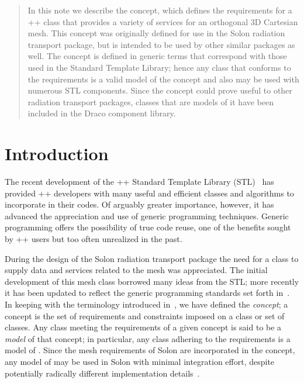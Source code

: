 \documentclass[11pt]{rnote}
\begin{document}
\begin{abstract}

In this note we describe the  concept, which defines the
requirements for a \C++ class that provides a variety of services for
an orthogonal 3D Cartesian mesh. This concept was originally defined
for use in the Solon radiation transport package, but is intended to
be used by other similar packages as well. The  concept is 
defined in generic terms that correspond with those used in the
Standard Template Library; hence any class that conforms to the
 requirements is a valid model of the  concept
and also may be used with numerous STL components. Since the
 concept could prove useful to other radiation transport
packages, classes that are models of it have been included in the
Draco component library.

\end{abstract}

\section{Introduction}

The recent development of the \C++ Standard Template Library
(STL)~\cite{ansi:cpp} has
provided \C++ developers with many useful and efficient classes and
algorithms to incorporate in their codes. Of arguably greater
importance, however, it has advanced the appreciation and use of
generic programming techniques. Generic programming offers the
possibility of true code reuse, one of the benefits sought by \C++
users but too often unrealized in the past.

During the design of the Solon radiation transport package the need
for a class to supply data and services related to the mesh was
appreciated. The initial development of this mesh class borrowed many
ideas from the STL; more recently it has been updated to reflect the
generic programming standards set forth in~\cite{au99}. In keeping with the
terminology introduced in~\cite{au99}, we have defined the  {\it
  concept}; a concept is the set of requirements and constraints
imposed on a class or set of classes. Any class meeting the
requirements of a given concept is said to be a {\it model} of that
concept; in particular, any class adhering to the 
requirements is a model of . Since the mesh requirements
of Solon are incorporated in the  concept, any model of
 may be used in Solon with minimal integration effort,
despite potentially radically different implementation
details~\cite{ro99}.
\end{document}
